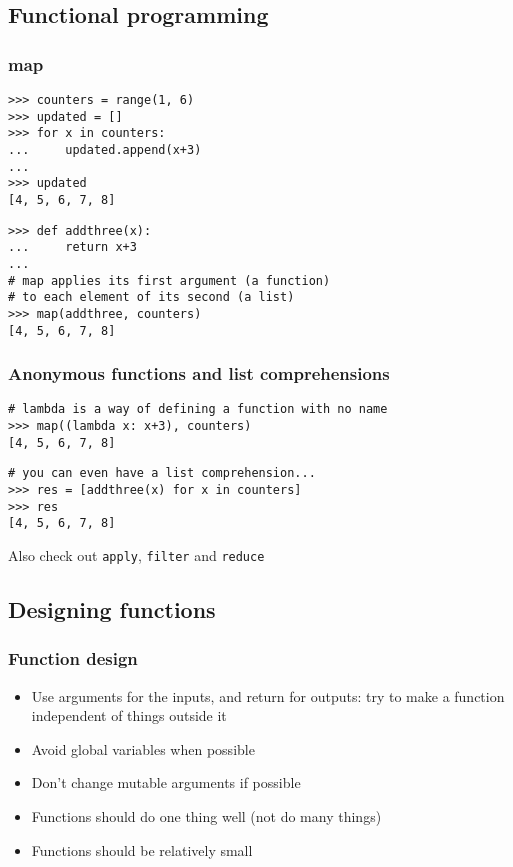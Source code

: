 \subsection{Functional programming}

\begin{frame}[fragile]
  \frametitle{map}
\begin{verbatim}
>>> counters = range(1, 6)
>>> updated = []
>>> for x in counters:
...     updated.append(x+3)
... 
>>> updated
[4, 5, 6, 7, 8]
\end{verbatim}
  \pause
\begin{verbatim}
>>> def addthree(x): 
...     return x+3
... 
# map applies its first argument (a function) 
# to each element of its second (a list)
>>> map(addthree, counters)
[4, 5, 6, 7, 8]
\end{verbatim}
\end{frame}

\begin{frame}[fragile]
  \frametitle{Anonymous functions and list comprehensions}
  \pause
\begin{verbatim}
# lambda is a way of defining a function with no name 
>>> map((lambda x: x+3), counters)
[4, 5, 6, 7, 8]
\end{verbatim}
  \pause
\begin{verbatim}
# you can even have a list comprehension...
>>> res = [addthree(x) for x in counters]
>>> res
[4, 5, 6, 7, 8]
\end{verbatim}

  Also check out \texttt{apply}, \texttt{filter} and \texttt{reduce}
  
\end{frame}


\subsection{Designing functions}
\begin{frame}
  \frametitle{Function design}

  \begin{itemize}
  \item Use arguments for the inputs, and return for outputs:  try to
    make a function independent of things outside it
  \item Avoid global variables when possible
  \item Don't change mutable arguments if possible
  \item Functions should do one thing well (not do many things)
  \item Functions should be relatively small
  \end{itemize}
\end{frame}


